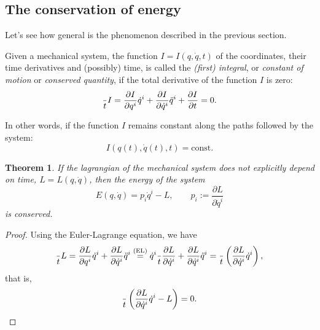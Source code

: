 \documentclass[english,fontsize=11pt,paper=a5,oneside]{scrbook}
\let\d\relax
\DeclareMathOperator{\d}{d}
\newtheorem{theorem}{Theorem}[chapter]
\theoremstyle{definition}
\begin{document}
\subsection{The conservation of energy}\label{sec:energy}

Let's see how general is the phenomenon described in the previous section.

\begin{tcolorbox}
    Given a mechanical system, the function $I = I(q, \dot q, t)$ of the coordinates, their time derivatives and (possibly) time, is called the \emph{(first) integral}, or \emph{constant of motion} or \emph{conserved quantity}, if the total derivative of the function $I$ is zero:
    \begin{equation}\label{eq:firstintegralD}
        \frac{\d}{\d t}I =
            \frac{\partial I}{\partial q^i} \dot q^i + 
            \frac{\partial I}{\partial \dot q^i} \ddot q^i +
            \frac{\partial I}{\partial t}
            = 0.
    \end{equation}
\end{tcolorbox}

In other words, if the function $I$ remains constant along the paths followed by the system:
\begin{equation}
    I(q(t),\dot q(t), t) = \mathrm{const}.
\end{equation}

\begin{theorem}\label{thm:conservationEnergy}
If the lagrangian of the mechanical system does not explicitly depend on time, $L = L(q, \dot q)$, then the \emph{energy} of the system
\begin{equation}\label{eq:energy1}
    E(q,\dot q) = p_i \dot q^i - L,\qquad p_i := \frac{\partial L}{\partial \dot q^i}
\end{equation}
is conserved.
\end{theorem}
\begin{proof}
    Using the Euler-Lagrange equation, we have
    \begin{equation}
        \frac{\d}{\d t} L
        = \frac{\partial L}{\partial q^i} \dot q^i + \frac{\partial L}{\partial \dot q^i} \ddot q^i
        \overset{\text{(EL)}}{=} \dot q^i \frac{\d}{\d t} \frac{\partial L}{\partial \dot q^i} + \frac{\partial L}{\partial \dot q^i} \ddot q^i
        = \frac{\d}{\d t}\left(\frac{\partial L}{\partial \dot q^i} \dot q^i\right),
    \end{equation}
    that is,
    \begin{equation}
        \frac{\d}{\d t}\left(\frac{\partial L}{\partial \dot q^i} \dot q^i - L\right) = 0.
    \end{equation}
\end{proof}
\end{document}
